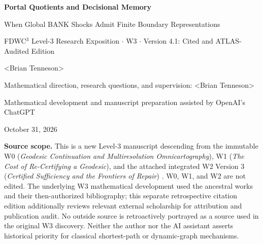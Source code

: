 \documentclass[11pt,letterpaper]{article}
\begin{document}
\begin{center}
{\LARGE\bfseries Portal Quotients and Decisional Memory\par}
\vspace{4pt}
{\large When Global BANK Shocks Admit Finite Boundary Representations\par}
\vspace{9pt}
{\normalsize FDWC$^3$ Level-3 Research Exposition $\cdot$ W3 $\cdot$ Version 4.1: Cited and ATLAS-Audited Edition\par}
\vspace{9pt}
{\large\textless Brian Tenneson\textgreater\par}
{\small Mathematical direction, research questions, and supervision: \textless Brian Tenneson\textgreater\par}
{\small Mathematical development and manuscript preparation assisted by OpenAI's ChatGPT\par}
{\small October 31, 2026\par}
\end{center}
\vspace{3pt}
\noindent\textbf{Source scope.} This is a new Level-3 manuscript descending from the immutable W0 (\emph{Geodesic Continuation and Multiresolution Omnicartography}), W1 (\emph{The Cost of Re-Certifying a Geodesic}), and the attached integrated W2 Version 3 (\emph{Certified Sufficiency and the Frontiers of Repair}) \cite{W0,W1,W2}. W0, W1, and W2 are not edited. The underlying W3 mathematical development used the ancestral works and their then-authorized bibliography; this separate retrospective citation edition additionally reviews relevant external scholarship for attribution and publication audit. No outside source is retroactively portrayed as a source used in the original W3 discovery. Neither the author nor the AI assistant asserts historical priority for classical shortest-path or dynamic-graph mechanisms.
\end{document}
